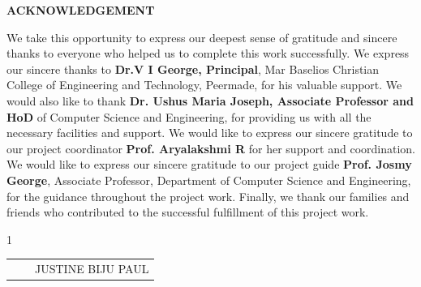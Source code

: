 \begin{center}
    \Large\textbf{ACKNOWLEDGEMENT}
\end{center}

\vspace{1cm}

\fontsize{12pt}{18pt}\selectfont

We take this opportunity to express our deepest sense of gratitude and sincere thanks
to everyone who helped us to complete this work successfully. We express our sincere
thanks to \textbf{Dr.V I George, Principal}, Mar
Baselios Christian College of Engineering and Technology, Peermade, for his valuable support. We would also
like to thank \textbf{Dr. Ushus Maria Joseph, Associate Professor and HoD} of Computer Science
and Engineering, for providing us with all the necessary facilities and
support. We would like to express our sincere gratitude to our project coordinator \textbf{Prof. Aryalakshmi R} for her support and coordination. We would like to express
our sincere gratitude to our project guide \textbf{Prof. Josmy George}, Associate Professor, Department of Computer Science and Engineering, for the guidance throughout the project work. Finally, we thank our families and friends who contributed to the successful fulfillment of this project work.
\vspace{1cm}

\begin{spacing}{1} 
	
	\begin{table}[h!]
		\centering
		\begin{tabular}{p{5.3cm} p{5.3cm} p{10cm}} 
			\textbf{} &  & {JUSTINE BIJU PAUL} \\
                
			
		\end{tabular}
	\end{table}
\end{spacing}




